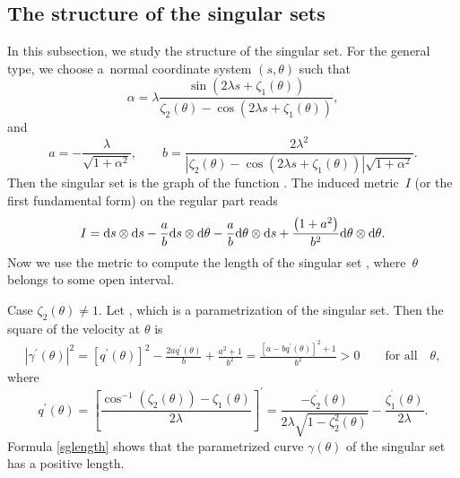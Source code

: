 \documentclass[10pt,a4paper]{amsart}
\numberwithin{equation}{section}
\begin{document}
\subsection{The structure of the singular sets} In this subsection, we study the structure of the singular set. For the general type, we choose a~normal coordinate system $(s,\theta )$
such that
\begin{equation*}%
\alpha =\lambda \frac{\sin \left( 2\lambda s+\zeta _{1}(\theta )\right) }{\zeta _{2}(\theta )-\cos \left( 2\lambda s+\zeta _{1}(\theta )\right) },
\end{equation*}
and
\begin{equation*}
a=-\frac{\lambda }{\sqrt{1+\alpha ^{2}}},\qquad b=\frac{2\lambda ^{2}}{\left \vert \zeta _{2}( \theta ) -\cos \left( 2\lambda s+\zeta
_{1}( \theta ) \right) \right \vert \sqrt{1+\alpha ^{2}}}.
\end{equation*}
Then the singular set is the graph of the function
.
The induced metric~$I$ (or the first fundamental form) on the regular part
reads
\begin{equation*}
I={\rm d}s\otimes {\rm d}s-\frac{a}{b}{\rm d}s\otimes {\rm d}\theta -\frac{a}{b}{\rm d}\theta \otimes {\rm d}s+
\frac{\bigl( 1+a^{2}\bigr) }{b^{2}}{\rm d}\theta \otimes {\rm d}\theta .
\end{equation*}
Now we use the metric to compute the length of the singular set , where~$\theta $ belongs to some
open interval.

Case $\zeta _{2}(\theta ) \neq 1$. Let , which is a parametrization
of the singular set. Then the square of the velocity at $\theta $ is
\begin{align}
\left \vert \gamma ^{\prime }(\theta )\right \vert ^{2} =\left[ q^{\prime
}( \theta ) \right] ^{2}-\frac{2aq^{\prime }( \theta )
}{b}+\frac{a^{2}+1}{b^{2}} =\frac{\left[ a-bq^{\prime }( \theta ) \right] ^{2}+1}{b^{2}}>0
\qquad\text{for all}\quad\theta , \label{sglength}
\end{align}
where
\begin{equation*}
q^{\prime }( \theta ) = \left[ \frac{\cos ^{-1}( \zeta
_{2}(\theta )) -\zeta _{1}(\theta )}{2\lambda }\right] ^{\prime }
= \frac{-\zeta _{2}^{^{\prime }}( \theta ) }{2\lambda \sqrt{
1-\zeta _{2}^{2}( \theta ) }}-\frac{\zeta _{1}^{^{\prime }}(
\theta ) }{2\lambda }.
\end{equation*}
Formula \eqref{sglength} shows that the parametrized curve $\gamma (\theta )$
of the singular set has a positive length.
\end{document}
